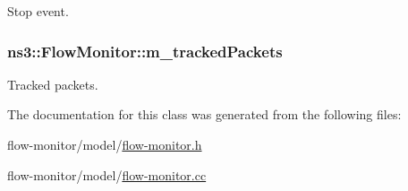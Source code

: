 Stop event. 

\subsubsection[{\texorpdfstring{m\+\_\+tracked\+Packets}{m_trackedPackets}}]{ ns3\+::\+Flow\+Monitor\+::m\+\_\+tracked\+Packets\hspace{0.3cm}{\ttfamily [private]}}\hypertarget{classns3_1_1FlowMonitor_ab4f63ca5c2a927337870110fa8233bce}{}\label{classns3_1_1FlowMonitor_ab4f63ca5c2a927337870110fa8233bce}


Tracked packets. 



The documentation for this class was generated from the following files\+:\begin{DoxyCompactItemize}
\item 
flow-\/monitor/model/\hyperlink{flow-monitor_8h}{flow-\/monitor.\+h}\item 
flow-\/monitor/model/\hyperlink{flow-monitor_8cc}{flow-\/monitor.\+cc}\end{DoxyCompactItemize}
